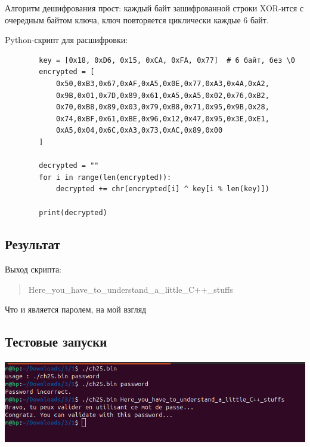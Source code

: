     Алгоритм дешифрования прост: каждый байт зашифрованной строки XOR-ится с очередным байтом ключа,
    ключ повторяется циклически каждые 6 байт.

    Python-скрипт для расшифровки:

    \begin{verbatim}
        key = [0x18, 0xD6, 0x15, 0xCA, 0xFA, 0x77]  # 6 байт, без \0
        encrypted = [
            0x50,0xB3,0x67,0xAF,0xA5,0x0E,0x77,0xA3,0x4A,0xA2,
            0x9B,0x01,0x7D,0x89,0x61,0xA5,0xA5,0x02,0x76,0xB2,
            0x70,0xB8,0x89,0x03,0x79,0xB8,0x71,0x95,0x9B,0x28,
            0x74,0xBF,0x61,0xBE,0x96,0x12,0x47,0x95,0x3E,0xE1,
            0xA5,0x04,0x6C,0xA3,0x73,0xAC,0x89,0x00
        ]

        decrypted = ""
        for i in range(len(encrypted)):
            decrypted += chr(encrypted[i] ^ key[i % len(key)])

        print(decrypted)
    \end{verbatim}

    \subsection{Результат}

    Выход скрипта:

    \begin{quote}
        Here\_you\_have\_to\_understand\_a\_little\_C++\_stuffs
    \end{quote}
    Что и является паролем, на мой взгляд

    \subsection{Тестовые запуски}

    \paragraph{}
    \includegraphics[width=1\linewidth]{static/solution_1}